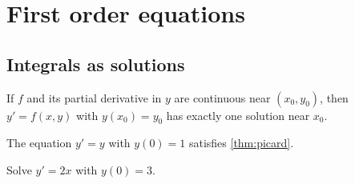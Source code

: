 \chapter{First order equations}
\section{Integrals as solutions}
\label{sec:integralsols}

\begin{thm}[Picard]
\label{thm:picard}
If $f$ and its partial derivative in $y$ are continuous near $(x_0,y_0)$,
then $y' = f(x,y)$ with $y(x_0) = y_0$ has exactly one solution near $x_0$.
\end{thm}

\begin{example}
The equation $y' = y$ with $y(0) = 1$ satisfies \ref{thm:picard}.
\end{example}

\begin{exercise}[easy]
Solve $y' = 2x$ with $y(0) = 3$.
\end{exercise}
